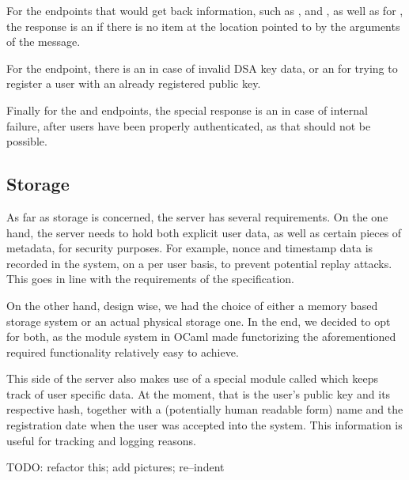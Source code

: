 For the endpoints that would get back information, such as ,  and , as well as for , the response is an  if there is no item at the location pointed to by the arguments of the message.

For the  endpoint, there is an  in case of invalid DSA key data, or an  for trying to register a user with an already registered public key.

Finally for the  and  endpoints, the special response is an  in case of internal failure, after users have been properly authenticated, as that should not be possible.

\subsection{Storage}
As far as storage is concerned, the server has several requirements.
On the one hand, the server needs to hold both explicit user data, as well as certain pieces of metadata, for security purposes.
For example, nonce and timestamp data is recorded in the system, on a per user basis, to prevent potential replay attacks.
This goes in line with the requirements of the specification.

On the other hand, design wise, we had the choice of either a memory based storage system or an actual physical storage one.
In the end, we decided to opt for both, as the module system in OCaml made functorizing the aforementioned required functionality relatively easy to achieve.

This side of the server also makes use of a special module called  which keeps track of user specific data.
At the moment, that is the user's public key and its respective hash, together with a (potentially human readable form) name and the registration date when the user was accepted into the system.
This information is useful for tracking and logging reasons.

TODO: refactor this; add pictures; re--indent

